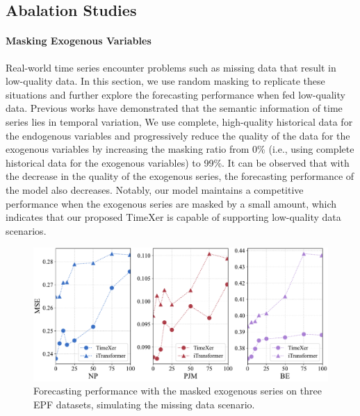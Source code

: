 \documentclass[nohyperref]{article}
\theoremstyle{plain}
\theoremstyle{definition}
\theoremstyle{remark}
\begin{document}
\subsection{Abalation Studies}

\paragraph{Masking Exogenous Variables} Real-world time series encounter problems such as missing data that result in low-quality data. In this section, we use random masking to replicate these situations and further explore the forecasting performance when fed low-quality data. Previous works \cite{dong2023simmtm} have demonstrated that the semantic information of time series lies in temporal variation, We use complete, high-quality historical data for the endogenous variables and progressively reduce the quality of the data for the exogenous variables by increasing the masking ratio from 0\% (i.e., using complete historical data for the exogenous variables) to 99\%.
It can be observed that with the decrease in the quality of the exogenous series, the forecasting performance of the model also decreases. Notably, our model maintains a competitive performance when the exogenous series are masked by a small amount, which indicates that our proposed TimeXer is capable of supporting low-quality data scenarios.
\begin{figure}[h]
    \centering
    \includegraphics[width=\linewidth]{fig/maskv3.pdf}
    \vspace{-20pt}
    \caption{Forecasting performance with the masked exogenous series on three EPF datasets, simulating the missing data scenario.}
    \vspace{-10pt}
    \label{fig:mask}
\end{figure}
\end{document}
